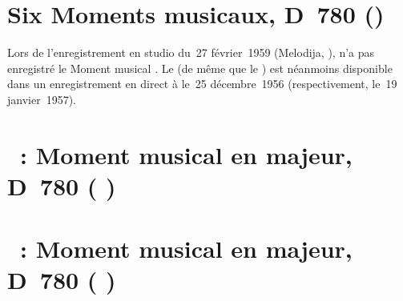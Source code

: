 \section*{%
Six Moments musicaux, D~780 ()}

Lors de l'enregistrement en studio du~27 février~1959 (Melodija, ),
\VSofronitsky{} n'a pas enregistré le Moment musical .
Le  (de même que le ) est néanmoins disponible dans un
enregistrement en direct à \MSHM le~25 décembre~1956 (respectivement, le~19
janvier~1957).

\section{\ifChrono \Schubert{}~: \fi
Moment musical  en \kC majeur, D~780  (
)}
\label{\thesection}

\begin{workitemize}
 \item{}
 \begin{perfitemize}
  \item{}
  \item{}
 \end{perfitemize}
\end{workitemize}

\section{\ifChrono \Schubert{}~: \fi
Moment musical  en \kA \Flat majeur, D~780  (
)}
\label{\thesection}

\begin{workitemize}
 \item{}
 \begin{perfitemize}
  \item{}
  \item{}
 \end{perfitemize}
\end{workitemize}

